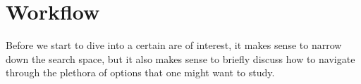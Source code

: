 \chapter{Workflow}
\label{chapter:high-level:workflow}


Before we start to dive into a certain are of interest, it makes sense to narrow down the search space, 
but it also makes sense to briefly discuss how to navigate through the plethora of options that one might want to study.